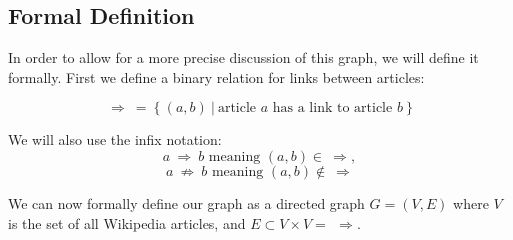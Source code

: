 \subsection{Formal Definition}
In order to allow for a more precise discussion of this graph, we will define it formally. First we define a binary relation for links between articles:

$$\Rightarrow\ =\ \{\ (a,b)\ |\ \text{article } a \text{ has a link to article } b\ \}$$

We will also use the infix notation:
$$a\ \Rightarrow\ b \text{ meaning } (a,b) \in\ \Rightarrow,$$ 
$$a\ \not\Rightarrow\ b \text{ meaning } (a,b) \not\in\ \Rightarrow$$

We can now formally define our graph as a directed graph $G = (V,E)$ where $V$ is the set of all Wikipedia articles, and $E\subset V \times V = \ \,  \Rightarrow$.